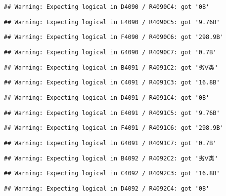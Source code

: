 \documentclass[
]{article}
\begin{document}
\begin{verbatim}
## Warning: Expecting logical in D4090 / R4090C4: got '0B'
\end{verbatim}

\begin{verbatim}
## Warning: Expecting logical in E4090 / R4090C5: got '9.76B'
\end{verbatim}

\begin{verbatim}
## Warning: Expecting logical in F4090 / R4090C6: got '298.9B'
\end{verbatim}

\begin{verbatim}
## Warning: Expecting logical in G4090 / R4090C7: got '0.7B'
\end{verbatim}

\begin{verbatim}
## Warning: Expecting logical in B4091 / R4091C2: got '劣Ⅴ类'
\end{verbatim}

\begin{verbatim}
## Warning: Expecting logical in C4091 / R4091C3: got '16.8B'
\end{verbatim}

\begin{verbatim}
## Warning: Expecting logical in D4091 / R4091C4: got '0B'
\end{verbatim}

\begin{verbatim}
## Warning: Expecting logical in E4091 / R4091C5: got '9.76B'
\end{verbatim}

\begin{verbatim}
## Warning: Expecting logical in F4091 / R4091C6: got '298.9B'
\end{verbatim}

\begin{verbatim}
## Warning: Expecting logical in G4091 / R4091C7: got '0.7B'
\end{verbatim}

\begin{verbatim}
## Warning: Expecting logical in B4092 / R4092C2: got '劣Ⅴ类'
\end{verbatim}

\begin{verbatim}
## Warning: Expecting logical in C4092 / R4092C3: got '16.8B'
\end{verbatim}

\begin{verbatim}
## Warning: Expecting logical in D4092 / R4092C4: got '0B'
\end{verbatim}
\end{document}
